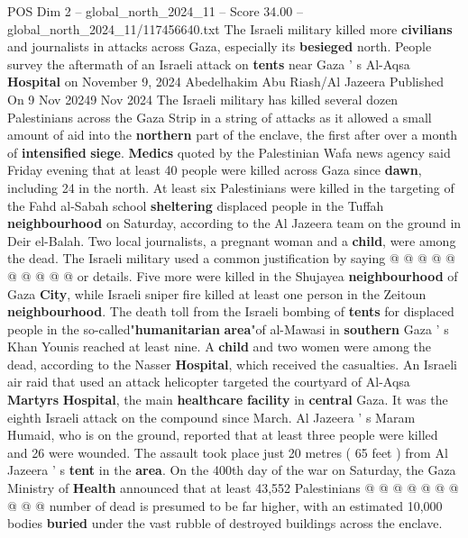 \begin{textsample}{POS Dim 2 – global\_north\_2024\_11 – Score 34.00 – global\_north\_2024\_11/117456640.txt}  \label{ex:f2_pos_352}
The Israeli military killed more \textbf{civilians} and journalists in attacks across Gaza, especially its \textbf{besieged} north.
People survey the aftermath of an Israeli attack on \textbf{tents} near Gaza ' s Al-Aqsa \textbf{Hospital} on November 9, 2024 Abedelhakim Abu Riash/Al Jazeera Published On 9 Nov 20249 Nov 2024 The Israeli military has killed several dozen Palestinians across the Gaza Strip in a string of attacks as it allowed a small amount of aid into the \textbf{northern} part of the enclave, the first after over a month of \textbf{intensified} \textbf{siege}. \textbf{Medics} quoted by the Palestinian Wafa news agency said Friday evening that at least 40 people were killed across Gaza since \textbf{dawn}, including 24 in the north.
At least six Palestinians were killed in the targeting of the Fahd al-Sabah school \textbf{sheltering} displaced people in the Tuffah \textbf{neighbourhood} on Saturday, according to the Al Jazeera team on the ground in Deir el-Balah.
Two local journalists, a pregnant woman and a \textbf{child}, were among the dead.
The Israeli military used a common justification by saying @ @ @ @ @ @ @ @ @ @ or details.
Five more were killed in the Shujayea \textbf{neighbourhood} of Gaza \textbf{City}, while Israeli sniper fire killed at least one person in the Zeitoun \textbf{neighbourhood}.
The death toll from the Israeli bombing of \textbf{tents} for displaced people in the so-called"\textbf{humanitarian} \textbf{area}"of al-Mawasi in \textbf{southern} Gaza ' s Khan Younis reached at least nine.
A \textbf{child} and two women were among the dead, according to the Nasser \textbf{Hospital}, which received the casualties.
An Israeli air raid that used an attack helicopter targeted the courtyard of Al-Aqsa \textbf{Martyrs} \textbf{Hospital}, the main \textbf{healthcare} \textbf{facility} in \textbf{central} Gaza.
It was the eighth Israeli attack on the compound since March.
Al Jazeera ' s Maram Humaid, who is on the ground, reported that at least three people were killed and 26 were wounded.
The assault took place just 20 metres ( 65 feet ) from Al Jazeera ' s \textbf{tent} in the \textbf{area}.
On the 400th day of the war on Saturday, the Gaza Ministry of \textbf{Health} announced that at least 43,552 Palestinians @ @ @ @ @ @ @ @ @ @ number of dead is presumed to be far higher, with an estimated 10,000 bodies \textbf{buried} under the vast rubble of destroyed buildings across the enclave.

\end{textsample}
